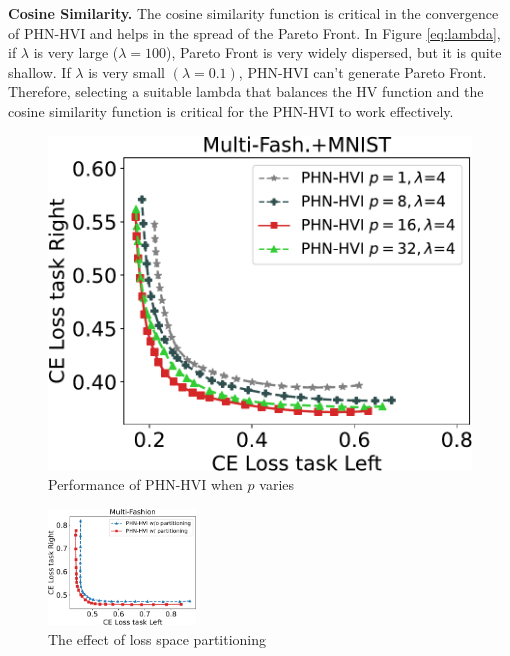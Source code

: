 \documentclass[letterpaper]{article} %
\newcommand{\ourmodel}{PHN-HVI }
\begin{document}
\textbf{Cosine Similarity.} The cosine similarity function is critical in the convergence of \ourmodel and helps in the spread of the Pareto Front. In Figure \ref{eq:lambda}, if $\lambda$ is very large ($\lambda=100$), Pareto Front is very widely dispersed, but it is quite shallow. If $\lambda$ is very small $(\lambda = 0.1)$, \ourmodel can't generate Pareto Front. Therefore, selecting a suitable lambda that balances the HV function and the cosine similarity function is critical for the \ourmodel to work effectively.
\begin{figure}[!htb]
\centering
\includegraphics[width=0.75\columnwidth]{figures/Compare_Head_2.pdf}
\caption{Performance of \ourmodel when $p$ varies}
\label{fig:head}
\end{figure}
\begin{figure}[!htb]
\centering
\includegraphics[width=0.675\columnwidth,height=1.21in ]{figures/Partition.pdf}
\caption{The effect of loss space partitioning}
\label{fig:adap_correct}
\end{figure}
\end{document}
